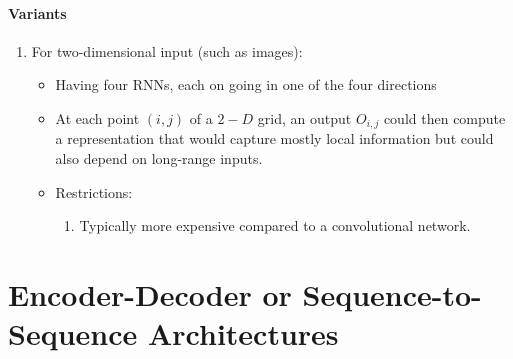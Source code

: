 \documentclass[12pt, a4paper]{article}
\begin{document}
\paragraph{Variants}
\begin{enumerate}
    \item{
        For two-dimensional input (such as images):
        \begin{itemize}
            \item Having four RNNs, each on going in one of the four directions
            \item At each point $(i,j)$ of a $2-D$ grid, an output $O_{i,j}$ could then compute a representation that would capture mostly local information but could also depend on long-range inputs.
            \item{
                Restrictions:
                \begin{enumerate}
                    \item Typically more expensive compared to a convolutional network.
                \end{enumerate}
            }
        \end{itemize}
    }
\end{enumerate}


\section{Encoder-Decoder or Sequence-to-Sequence Architectures}
\end{document}
